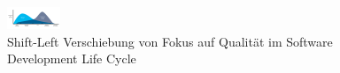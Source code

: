 \begin{figure}
    \centering
    \includegraphics[width=0.9\linewidth]{images/Shift_Left.png}
    \caption{Shift-Left Verschiebung von Fokus auf Qualität im Software Development Life Cycle}
    \label{fig:shiftleft}
  \end{figure}

